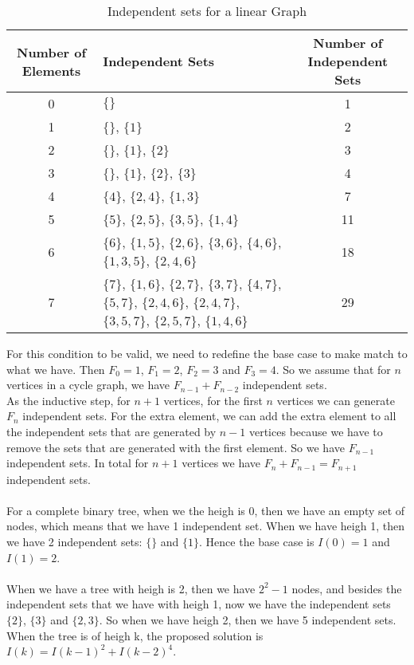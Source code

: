 \documentclass[tikz, 12pt]{scrartcl}
\begin{document}
\begin{enumerate}
\begin{longtable}{|c|p{5cm}|c|}
\caption{Independent sets for a linear Graph\label{linearGraph}}\\
\hline
Number of Elements	&	Independent Sets	&	Number of Independent Sets\\
\hline
	0			&	$\{\}$													&	1		\\
	\hline
	1			&	$\{\}$, $\{1\}$												&	2		\\
	\hline
	2			&	$\{\}$, $\{1\}$, $\{2\}$											&	3		\\
	\hline
	3			&	$\{\}$, $\{1\}$, $\{2\}$, $\{3\}$									&	4		\\
	\hline
	4			&	$\{4\}$, $\{2,4\}$, $\{1, 3\}$									&	7	\\
	\hline
	5			&	$\{5\}$, $\{2, 5\}$, $\{3, 5\}$, $\{1, 4\}$							&	11	\\
	\hline
	6			&	$\{6\}$, $\{1, 5\}$, $\{2, 6\}$, $\{3, 6\}$, $\{4, 6\}$, $\{1, 3, 5\}$, $\{2, 4, 6\}$	&	18\\
	\hline
	7			&	$\{7\}$, $\{1, 6\}$, $\{2, 7\}$, $\{3, 7\}$, $\{4, 7\}$, $\{5, 7\}$, $\{2, 4, 6\}$, $\{ 2, 4, 7\}$, $\{3, 5, 7\}$, $\{2, 5, 7\}$, $\{1, 4, 6\}$ 	&  29\\
\hline
\end{longtable}	 	

For this condition to be valid, we need to redefine the base case to make match to what we have. Then $F_0 = 1$, $F_1 = 2$, $F_2 =3$ and $F_3 = 4$. So we assume that for $n$ vertices in a cycle graph, we have $F_{n - 1} + F_{n- 2}$ independent sets.\\
As the inductive step, for $n + 1$ vertices, for the first $n$ vertices we can generate $F_{n}$ independent sets. For the extra element, we can add the extra element to all the independent sets that are generated by $n-1$ vertices because we have to remove the sets that are generated with the first element. So we have $F_{n -1}$ independent sets. In total for $n + 1$ vertices we have $F_{n} + F_{n - 1} = F_{n + 1}$ independent sets.\\
\\
For a complete binary tree, when we the heigh is 0, then we have an empty set of nodes, which means that we have 1 independent set. When we have heigh 1, then we have 2 independent sets: $\{\}$ and $\{1\}$. Hence the base case is $I(0) = 1$ and $I(1) = 2$. 	\\
\\
When we have a tree with heigh is 2, then we have $2^2 - 1$ nodes, and besides the independent sets that we have with heigh 1, now we have the independent sets $\{2\}$, $\{3\}$ and $\{2, 3\}$. So when we have heigh 2, then we have 5 independent sets. When the tree is of heigh k, the proposed solution is $I(k) = I(k - 1)^2 + I(k - 2)^4$.


\end{enumerate}
\end{document}
